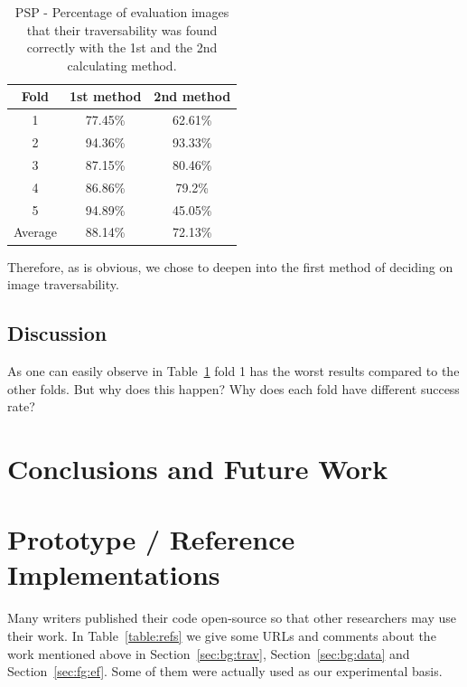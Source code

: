 \documentclass[12pt,a4paper]{report}
\newcommand{\acronym}{\MakeUppercase}
\begin{document}
	\begin{table}[h!]
		\centering
		\begin{tabular}{|c|c|c|}
			\hline
			Fold & 1st method & 2nd method\\ 
			\hline\hline
			1 & 77.45\% & 62.61\%\\
			\hline
			2 & 94.36\% & 93.33\%\\
			\hline
			3 & 87.15\% & 80.46\%\\
			\hline
			4 & 86.86\% & 79.2\%\\
			\hline
			5 & 94.89\% & 45.05\%\\
			\hline\hline
			Average & 88.14\% & 72.13\%\\
			\hline
		\end{tabular}
		\caption{\acronym{psp} - Percentage of evaluation images that their 
		traversability was found correctly with the 1st and the 2nd calculating 
		method.}
		\label{table:psp}
	\end{table}
	
	Therefore, as is obvious, we chose to deepen into the first method of deciding on 
	image traversability.
	\\
	
	\section{Discussion}
	\label{sec:exp:dis}
	
	As one can easily observe in Table~\ref{table:psp} fold 1 has the worst results 
	compared to the other folds. But why does this happen? Why does each fold have 
	different success rate?
	\\
	
	
	\chapter{Conclusions and Future Work}
	\label{sec:concl}
	
	
	\appendix
	\chapter{Prototype / Reference Implementations}
	\label{app:impl}
	
	Many writers published their code open-source so that other researchers may 
	use their work. In Table~\ref{table:refs} we give some \acronym{url}s and 
	comments about the work mentioned above in Section~\ref{sec:bg:trav}, 
	Section~\ref{sec:bg:data} and Section~\ref{sec:fg:ef}. Some of them were 
	actually used as our experimental basis.
	\\
	
\end{document}
